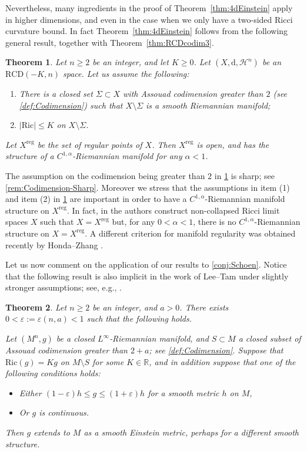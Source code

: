 \documentclass[12pt,a4paper,reqno]{amsart}
\newtheorem{theorem}{Theorem}[section]
\renewcommand{\leq}{\leqslant}
\renewcommand{\geq}{\geqslant}
\renewcommand{\epsilon}{\varepsilon}
\begin{document}
Nevertheless, many ingredients in the proof of Theorem~\ref{thm:4dEinstein} apply in higher dimensions, and even in the case when we only have a two-sided Ricci curvature bound. In fact Theorem~\ref{thm:4dEinstein} follows from the following general result, together with Theorem~\ref{thm:RCDcodim3}. 
\begin{theorem}\label{thm:extension}
    Let $n\geq 2$ be an integer, and let $K\geq 0$. Let $(X,\mathrm{d},\mathcal{H}^n)$ be an $\mathrm{RCD}(-K,n)$ space. Let us assume the following:
    \begin{enumerate}
        \item There is a closed set $\Sigma \subset X$ with Assouad codimension greater than $2$ (see \cref{def:Codimension}) such that $X\setminus\Sigma$ is a smooth Riemannian manifold;
        \item $|\mathrm{Ric}| \leq K$ on $X\setminus \Sigma$.
    \end{enumerate}
    Let $X^{\mathrm{reg}}$ be the set of regular points of $X$. Then $X^{\mathrm{reg}}$ is open, and has the structure of a $C^{1,\alpha}$-Riemannian manifold for any $\alpha < 1$.
\end{theorem}
The assumption on the codimension being greater than $2$ in \cref{thm:extension} is sharp; see \cref{rem:Codimension-Sharp}. Moreover we stress that the assumptions in item (1) and item (2) in \cref{thm:extension} are important in order to have a $C^{1,\alpha}$-Riemannian manifold structure on $X^{\mathrm{reg}}$. In fact, in \cite[Theorem 1.2]{ColdingNaberReifenberg} the authors construct non-collapsed Ricci limit spaces $X$ such that $X=X^{\mathrm{reg}}$ but, for any $0<\alpha<1$, there is no $C^{1,\alpha}$-Riemannian structure on $X=X^{\mathrm{reg}}$. A different criterion for manifold regularity was obtained recently by Honda--Zhang \cite[Theorem 1.1]{HondaZhang}.  
\smallskip

Let us now comment on the application of our results to \cref{conj:Schoen}. Notice that the following result is also implicit in the work of Lee--Tam \cite{LeeTam} under slightly stronger assumptions; see, e.g., \cite[Corollary 1.1]{LeeTam}.

\begin{theorem}\label{thm:highdimEinstein}
  Let $n\geq 2$ be an integer, and $a>0$. There exists $0<\varepsilon:=\varepsilon(n,a)<1$ such that the following holds.
  
  Let $(M^n, g)$ be a closed $L^\infty$-Riemannian manifold, and $S\subset M$ a closed subset of Assouad codimension greater than $2+a$; see \cref{def:Codimension}. Suppose that $\mathrm{Ric}(g) = Kg$ on $M\setminus S$ for some $K\in\mathbb R$, and in addition suppose that one of the following conditions holds:
  \begin{itemize}
      \item[(a)] Either $(1 - \epsilon)h \leq g \leq (1+\epsilon) h$ for a smooth metric $h$ on $M$,
      \item[(b)] Or $g$ is continuous. 
  \end{itemize}
    Then $g$ extends to $M$ as a smooth Einstein metric, perhaps for a different smooth structure.
\end{theorem}
\end{document}
